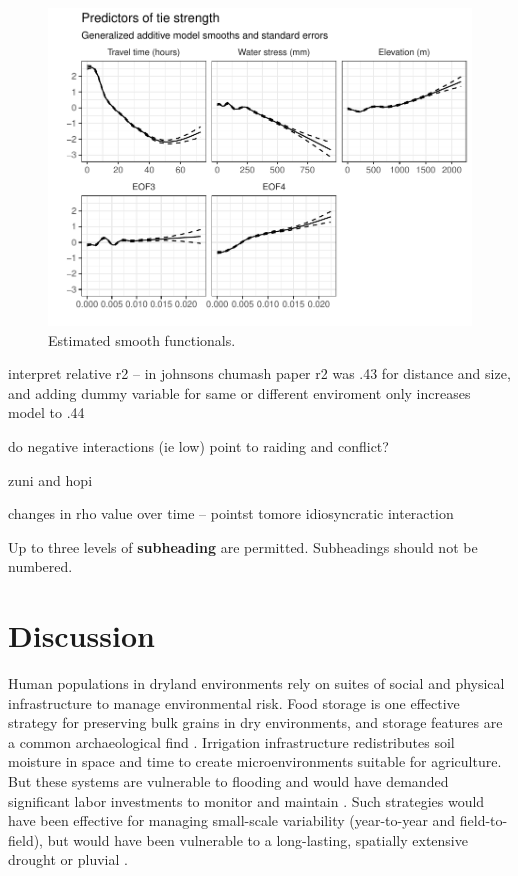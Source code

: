 \documentclass[fleqn,10pt]{wlscirep}
\begin{document}
\begin{figure}[ht]
\centering
\includegraphics[width=.8\linewidth]{figures/smooths.pdf}
\caption{Estimated smooth functionals.}
\label{fig:smooths}
\end{figure}

interpret relative r2 -- in johnsons chumash paper r2 was .43 for distance and size, and adding dummy variable for same or different enviroment only increases model to .44

do negative interactions (ie low) point to raiding and conflict?

zuni and hopi

changes in rho value over time -- pointst tomore idiosyncratic interaction

Up to three levels of \textbf{subheading} are permitted. Subheadings should not be numbered.

\section*{Discussion}
Human populations in dryland environments rely on suites of social and physical infrastructure to manage environmental risk. Food storage is one effective strategy for preserving bulk grains in dry environments, and storage features are a common archaeological find \cite{Spielmann2011SustainableEnvironments}. Irrigation infrastructure redistributes soil moisture in space and time to create microenvironments suitable for agriculture. But these systems are vulnerable to flooding and would have demanded significant labor investments to monitor and maintain \cite{Dominguez2005}. Such strategies would have been effective for managing small-scale variability (year-to-year and field-to-field), but would have been vulnerable to a long-lasting, spatially extensive drought or pluvial \cite{Halstead1989}.
\end{document}
